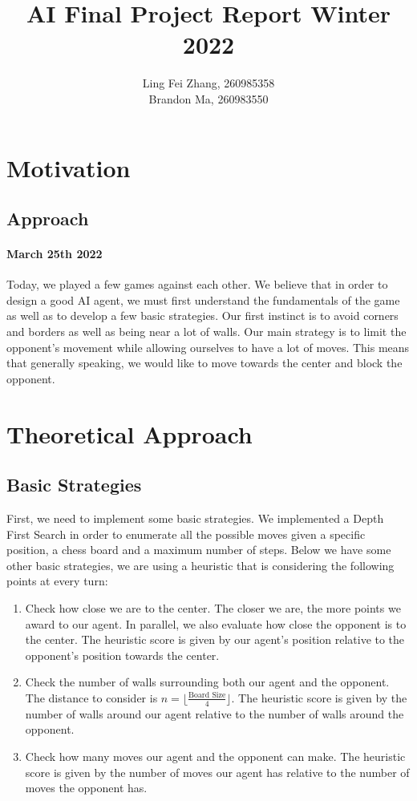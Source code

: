 \documentclass[12pt,a4paper]{article}
\author{Ling Fei Zhang, 260985358\\
Brandon Ma, 260983550}
\begin{document}
\title{AI Final Project Report Winter 2022}    
\maketitle


\section{Motivation}
\subsection{Approach}
\paragraph{March 25th 2022}
Today, we played a few games against each other. We believe that in order to design a good AI agent, 
we must first understand the fundamentals of the game as well as to develop a few basic strategies. 
Our first instinct is to avoid 
corners and borders as well as being near a lot of walls. Our main strategy is to limit the opponent's 
movement while allowing ourselves to have a lot of moves. This means that generally speaking, we would 
like to move towards the center and block the opponent. 


\section{Theoretical Approach}
\subsection{Basic Strategies}
First, we need to implement some basic strategies. We implemented a Depth First Search in order to enumerate 
all the possible moves given a specific position, a chess board and a maximum number of steps. Below we 
have some other basic strategies, we are using a heuristic that is considering the following points at every turn:
\begin{enumerate}
    \item Check how close we are to the center. The closer we are, the more points we award to our agent. 
    In parallel, we also evaluate how close the opponent is to the center. The heuristic score is given by 
    our agent's position relative to the opponent's position towards the center. 
    \item  Check the number of walls surrounding both our agent and the opponent. The distance to consider 
    is $n = \lfloor\frac{\text{Board Size}}{4}\rfloor$. The heuristic score is given by 
    the number of walls around our agent relative to the number of 
    walls around the opponent. 
    \item Check how many moves our agent and the opponent can make. The heuristic score is given by the 
    number of moves our agent has relative to the number of moves the opponent has. 
\end{enumerate}
\end{document}
